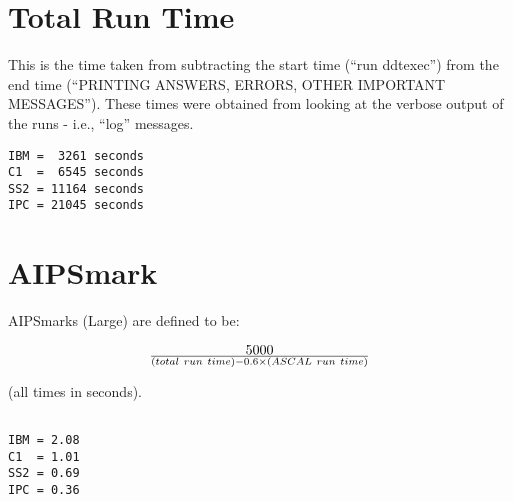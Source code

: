 
\section{Total Run Time}

This is the time taken from subtracting the start time (``run ddtexec'')
from the end time (``PRINTING ANSWERS, ERRORS, OTHER IMPORTANT
MESSAGES''). These times were obtained from looking at the verbose
output of the runs - i.e., ``log'' messages.

\begin{verbatim}
IBM =  3261 seconds
C1  =  6545 seconds
SS2 = 11164 seconds
IPC = 21045 seconds
\end{verbatim}

\section{AIPSmark}

AIPSmarks (Large) are defined to be:

$$ 5000 \over {(total~run~time) - 0.6 \times (ASCAL~run~time)} $$

(all times in seconds).

\begin{verbatim}

IBM = 2.08
C1  = 1.01
SS2 = 0.69
IPC = 0.36

\end{verbatim}


